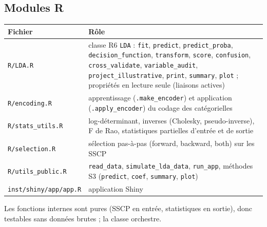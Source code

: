 \documentclass[10.5pt,a4paper]{article}
\newcommand{\code}[1]{\texttt{#1}}
\begin{document}
\subsection{Modules R}
\begin{center}
\begin{tabularx}{\textwidth}{|l|X|}\hline
\textbf{Fichier} & \textbf{R\^ole}\\\hline
\code{R/LDA.R} & classe R6 \code{LDA} : \code{fit}, \code{predict}, \code{predict\_proba}, \code{decision\_function}, \code{transform}, \code{score}, \code{confusion}, \code{cross\_validate}, \code{variable\_audit}, \code{project\_illustrative}, \code{print}, \code{summary}, \code{plot} ; propri\'et\'es en lecture seule (liaisons actives)\\\hline
\code{R/encoding.R} & apprentissage (\code{.make\_encoder}) et application (\code{.apply\_encoder}) du codage des cat\'egorielles\\\hline
\code{R/stats\_utils.R} & log-d\'eterminant, inverses (Cholesky, pseudo-inverse), F de Rao, statistiques partielles d'entr\'ee et de sortie\\\hline
\code{R/selection.R} & s\'election pas-\`a-pas (forward, backward, both) sur les SSCP\\\hline
\code{R/utils\_public.R} & \code{read\_data}, \code{simulate\_lda\_data}, \code{run\_app}, m\'ethodes S3 (\code{predict}, \code{coef}, \code{summary}, \code{plot})\\\hline
\code{inst/shiny/app/app.R} & application Shiny\\\hline
\end{tabularx}
\end{center}
Les fonctions internes sont pures (SSCP en entr\'ee, statistiques en sortie), donc testables sans donn\'ees brutes ; la classe orchestre.
\end{document}
